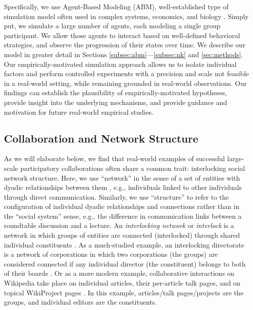 \documentclass[manuscript,screen,review,acmsmall]{acmart}
\begin{document}
Specifically, we use Agent-Based Modeling (ABM),
well-established type of simulation model often used in complex systems,
economics, and biology
\cite{hong_groups_2004,
lazer_network_2007,
golub_naive_2010,
zollman_social_2012,
grim_scientific_2013,
barkoczi_social_2016,
gomez_clustering_2019}.
Simply put, we simulate a large number of agents, each modeling a single group participant.
We allow those agents to interact based on well-defined behavioral strategies,
and observe the progression of their states over time.
We describe our model in greater detail in
Sections \ref{subsec:abm}---\ref{subsec:nk} and \ref{sec:methods}.
Our empirically-motivated simulation approach allows us to isolate individual factors and perform controlled experiments with a precision and scale not feasible in a real-world setting, while remaining grounded in real-world observations.
Our findings can establish the plausibility of empirically-motivated hypotheses,
provide insight into the underlying mechanisms,
and provide guidance and motivation for future real-world empirical studies.

\subsection{Collaboration and Network Structure}
As we will elaborate below,
we find that real-world examples of successful large-scale participatory collaborations
often share a common trait:
interlocking social network structure.
Here, we use ``network'' in the sense of a set of entities with dyadic relationships between them \cite{newman_networks_2018}, e.g.,
individuals linked to other individuals through direct communication.
Similarly, we use ``structure'' to refer to the configuration of individual dyadic relationships and connections rather than in the ``social system'' sense, e.g., the difference in communication links between a roundtable discussion and a lecture.
An {\em interlocking network} or {\em interlock}
is a network in which groups of entities are connected (interlocked)
through shared individual constituents \cite{taylor_world_2015}.
As a much-studied example,
an interlocking directorate is a network of corporations
in which two corporations (the groups) are considered connected if any individual director (the constituent) belongs to both of their boards 
\cite{mizruchi_what_1996}.
Or as a more modern example,
collaborative interactions on Wikipedia take place on individual articles, their per-article talk pages, and on topical WikiProject pages \cite{platt_network_2018}.
In this example, articles/talk pages/projects are the groups, and individual editors are the constituents.
\end{document}
